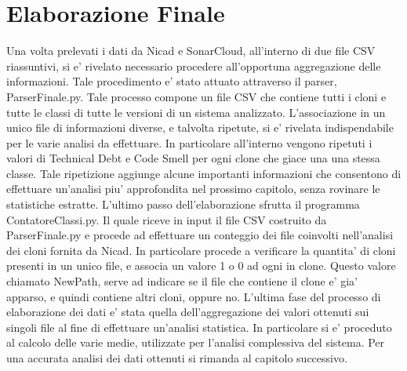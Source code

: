 \section{Elaborazione Finale}
Una volta prelevati i dati da Nicad e SonarCloud, all'interno di due file CSV riassuntivi, si e' rivelato necessario procedere all'opportuna aggregazione delle informazioni. Tale procedimento e' stato attuato attraverso il parser,  ParserFinale.py. Tale processo compone un file CSV che contiene tutti i cloni e tutte le classi di tutte le versioni di un sistema analizzato. L'associazione in un unico file di informazioni diverse, e talvolta ripetute, si e' rivelata indispendabile per le varie analisi da effettuare. In particolare all'interno vengono ripetuti i valori di Technical Debt e Code Smell per ogni clone che giace una una stessa classe. Tale ripetizione aggiunge alcune importanti informazioni che consentono di effettuare un'analisi piu' approfondita nel prossimo capitolo, senza rovinare le statistiche estratte.
L'ultimo passo dell'elaborazione sfrutta il programma ContatoreClassi.py. Il quale riceve in input il file CSV costruito da ParserFinale.py e procede ad effettuare un conteggio dei file coinvolti nell'analisi dei cloni fornita da Nicad. In particolare procede a verificare la quantita' di cloni presenti in un unico file, e associa un valore 1 o 0 ad ogni in clone. Questo valore chiamato NewPath, serve ad indicare se il file che contiene il clone e' gia' apparso, e quindi contiene altri cloni, oppure no.
L'ultima fase del processo di elaborazione dei dati e' stata quella dell'aggregazione dei valori ottenuti sui singoli file al fine di effettuare un'analisi statistica. In particolare si e' proceduto al calcolo delle varie medie, utilizzate per l'analisi complessiva del sistema. Per una accurata analisi dei dati ottenuti si rimanda al capitolo successivo.
